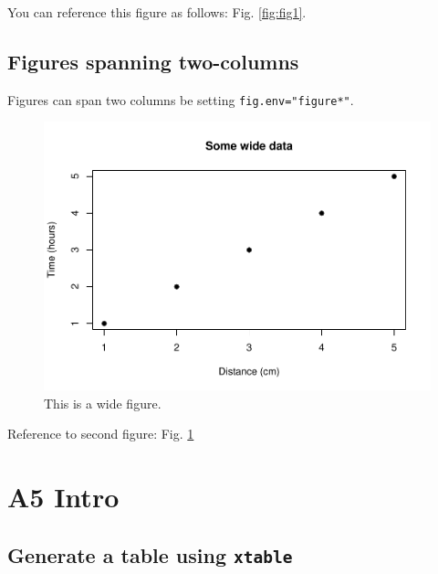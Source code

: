 \documentclass[webpdf,large,contemporary,namedate]{oup-authoring-template}
\theoremstyle{thmstyleone}
\theoremstyle{thmstyletwo}
\theoremstyle{thmstylethree}
\begin{document}
You can reference this figure as follows: Fig. \ref{fig:fig1}.

\hypertarget{figures-spanning-two-columns}{%
\subsection{Figures spanning
two-columns}\label{figures-spanning-two-columns}}

Figures can span two columns be setting \texttt{fig.env="figure*"}.

\begin{figure}[th]
\includegraphics[width=1\linewidth]{stochastic_process_1_files/figure-latex/fig2-1} \caption{This is a wide figure.}\label{fig:fig2}
\end{figure}

Reference to second figure: Fig. \ref{fig:fig2}

\hypertarget{a5-intro}{%
\section{A5 Intro}\label{a5-intro}}

\hypertarget{generate-a-table-using-xtable}{%
\subsection{\texorpdfstring{Generate a table using
\texttt{xtable}}{Generate a table using xtable}}\label{generate-a-table-using-xtable}}
\end{document}
